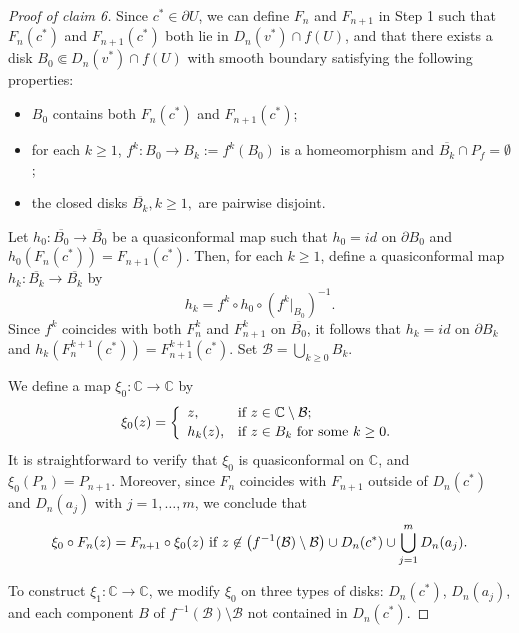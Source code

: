 \documentclass[a4paper,reqno,times, 11pt]{amsart}
\theoremstyle{remark}
\theoremstyle{plain}
\numberwithin{equation}{section}
\def\C{\mbox{$\mathbb C$}}
\begin{document}
		\begin{proof}[Proof of claim 6]
			Since $c^*\in\partial U$, we can define $F_n$ and $F_{n+1}$ in Step 1 such that $F_n(c^*)$ and $F_{n+1}(c^*)$ both lie in $D_n(v^*)\cap f( U)$, and that there exists a disk $B_0\Subset D_n(v^*)\cap f( U)$ with smooth boundary satisfying the following properties:
			\begin{itemize}
				\item $B_0$ contains both $F_n(c^*)$ and $F_{n+1}(c^*)$;
				\item for each $k\geq 1$, $f^k:B_0\to B_k:=f^k(B_0)$ is a homeomorphism and $\overline{B_k}\cap P_f=\emptyset$;
				\item the closed disks $\overline{B_k},k\geq1,$ are pairwise disjoint.
			\end{itemize}
			
			
			
			Let $h_0:\overline{B_0}\to \overline{B_0}$ be a quasiconformal map such that $h_0=id$ on $\partial B_0$ and $h_0(F_n(c^*))=F_{n+1}(c^*)$. Then, for each $k\geq1$, define a quasiconformal map $h_k:\overline{B_k}
			\to \overline{B_k}$ by $$h_k=f^k\circ h_0\circ (f^k|_{B_0})^{-1}.$$ Since $f^k$ coincides with both $F_n^k$ and $F_{n+1}^k$ on $\overline{B_0}$, it follows that
			$h_k=id$ on $\partial B_k$ and $h_k(F_n^{k+1}(c^*))=F_{n+1}^{k+1}(c^*)$. Set $\mathcal{B}=\bigcup_{k\geq0}B_k$.
			
			
			We define a map $\xi_0:\C\to \C$ by
			\[\xi_0(z)=\left\{
			\begin{array}{ll}
				z, & \hbox{if $z\in\C\setminus \mathcal{B}$;} \\[2pt]
				h_k(z), & \hbox{if $z\in B_k$ for some $k\geq 0$.}
			\end{array}
			\right.\]
			It is straightforward to verify that $\xi_0$ is quasiconformal on $\C$, and $\xi_0(P_{n})=P_{n+1}$. Moreover, since $F_n$ coincides with  $F_{n+1}$  outside of $D_n(c^*)$ and $D_n(a_j)$ with $j=1,\ldots,m$, we conclude that
			\begin{equation}\label{eq:33}
				\xi_0\circ F_n(z)=F_{n+1}\circ \xi_0(z)\ \textup{if } z\not\in \left(f^{-1}(\mathcal{B})\setminus\mathcal{B}\right)\cup D_n(c^*)\cup\bigcup_{j=1}^m D_n(a_j).
			\end{equation}
			
			To construct $\xi_1:\C\to\C$, we modify $\xi_0$ on three types of disks: $D_n(c^*)$, $D_n(a_j)$, and each component $B$ of $f^{-1}(\mathcal{B})\setminus \mathcal{B}$ not contained in $D_n(c^*)$.\vspace{1pt}
			

\end{proof}
\end{document}
